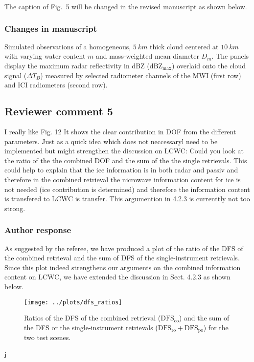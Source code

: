 The caption of Fig.~5 will be changed in the revised manuscript as shown below.

\subsubsection*{Changes in manuscript}
 

\begin{change}[284]
Simulated observations of a homogeneous, $5\ \unit{km}$ thick \DIFaddbeginFL {}\DIFaddendFL cloud
  \DIFdelbeginFL {}\DIFdelendFL centered at $10\ \unit{km}$ with varying water content $m$ and
  mass-weighted mean diameter $D_m$. The panels display the maximum radar
  reflectivity in dBZ ($\text{dBZ}_\text{max}$) overlaid onto the cloud signal
  ($\Delta T_B$) measured by selected radiometer channels of the MWI (first row)
  and ICI radiometers (second row).
  \end{change}

\subsection*{Reviewer comment 5}

I really like Fig. 12 It shows the clear contribution in DOF from the different
parameters. Just as a quick idea which does not neccessaryl need to be
implemented but might strengthen the discussion on LCWC: Could you look at the
ratio of the the combined DOF and the sum of the the single retrievals. This
could help to explain that the ice information is in both radar and passiv and
therefore in the combined retrieval the nicrowave information content for ice is
not needed (ice contribution is determined) and therefore the information
content is transfered to LCWC is transfer. This argumention in 4.2.3 is
currenttly not too strong.

\subsubsection{Author response}

As suggested by the referee, we have produced a plot of the ratio of the DFS of
the combined retrieval and the sum of DFS of the single-instrument retrievals.
Since this plot indeed strengthens our arguments on the combined information
content on LCWC, we have extended the discussion in Sect. 4.2.3 as shown below.

\begin{figure}
  \centering
  \texttt{[image: ../plots/dfs\_ratios]}
  \caption{Ratios of the DFS of the combined retrieval ($\text{DFS}_\text{co}$) and
    the sum of the DFS or the single-instrument retrievals ($\text{DFS}_\text{ro} + \text{DFS}_\text{po}$)
    for the two test scenes.}
  \label{fig:dfs_ratios}
\end{figure}
j
